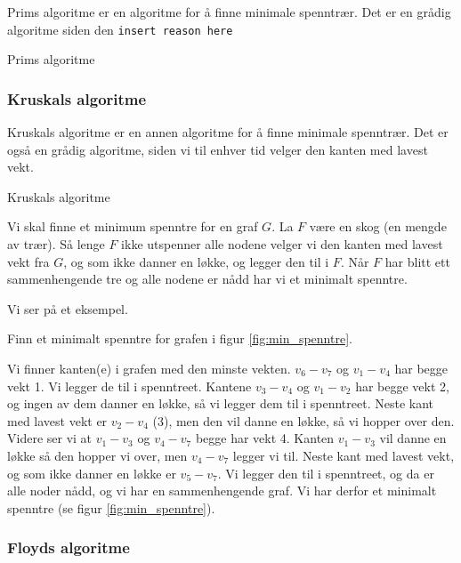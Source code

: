 Prims algoritme er en algoritme for å finne minimale spenntrær. Det er en grådig algoritme siden den \color{red}\verb|insert reason here|\color{black}

\begin{teorem} Prims algoritme


\end{teorem}



\subsubsection{\color{red}Kruskals algoritme}
\label{kruskal}

Kruskals algoritme er en annen algoritme for å finne minimale spenntrær. Det er også en grådig algoritme, siden vi til enhver tid velger den kanten med lavest vekt.  

\begin{teorem} Kruskals algoritme

Vi skal finne et minimum spenntre for en graf $ G $. La $ F $ være en skog (en mengde av trær). Så lenge $ F $ ikke utspenner alle nodene velger vi den kanten med lavest vekt fra $ G $, og som ikke danner en løkke, og legger den til i $ F $. Når $ F $ har blitt ett sammenhengende tre og alle nodene er nådd har vi et minimalt spenntre.
\end{teorem}

\noindent Vi ser på et eksempel.

\begin{eks} Finn et minimalt spenntre for grafen i figur \ref{fig:min_spenntre}.

Vi finner kanten(e) i grafen med den minste vekten. $ v_6-v_7 $ og $ v_1-v_4 $ har begge vekt 1. Vi legger de til i spenntreet. Kantene $ v_3-v_4 $ og $ v_1-v_2 $ har begge vekt 2, og ingen av dem danner en løkke, så vi legger dem til i spenntreet. Neste kant med lavest vekt er $ v_2-v_4 $ (3), men den vil danne en løkke, så vi hopper over den. Videre ser vi at $ v_1-v_3 $ og $ v_4-v_7 $ begge har vekt 4. Kanten $ v_1-v_3 $ vil danne en løkke så den hopper vi over, men $ v_4-v_7 $ legger vi til. Neste kant med lavest vekt, og som ikke danner en løkke er $ v_5-v_7 $. Vi legger den til i spenntreet, og da er alle noder nådd, og vi har en sammenhengende graf. Vi har derfor et minimalt spenntre (se figur \ref{fig:min_spenntre}). 
\end{eks}


\subsubsection{\color{red}Floyds algoritme}
\label{floyd}